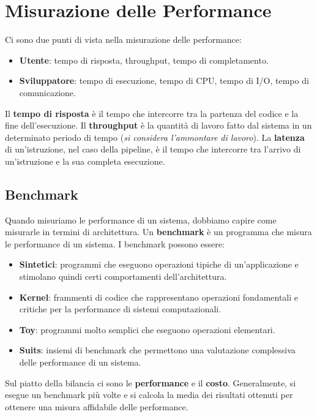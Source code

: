 \chapter{Misurazione delle Performance}

Ci sono due punti di vista nella misurazione delle
performance:
\begin{itemize}
  \item \textbf{Utente}: tempo di risposta, throughput,
  tempo di completamento.
  \item \textbf{Sviluppatore}: tempo di esecuzione, tempo
  di CPU, tempo di I/O, tempo di comunicazione.
\end{itemize}

Il \textbf{tempo di risposta} è il tempo che intercorre
tra la partenza del codice e la fine dell'esecuzione. Il
\textbf{throughput} è la quantità di lavoro fatto dal
sistema in un determinato periodo di tempo (\textit{si considera
l'ammontare di lavoro}). La \textbf{latenza} di
un'istruzione, nel caso della pipeline, è il tempo che
intercorre tra l'arrivo di un'istruzione e la sua completa
esecuzione.

\section{Benchmark}

Quando misuriamo le performance di un sistema, dobbiamo
capire come misurarle in termini di architettura. Un
\textbf{benchmark} è un programma che misura le
performance di un sistema. I benchmark possono essere:
\begin{itemize}
  \item \textbf{Sintetici}: programmi che eseguono
  operazioni tipiche di un'applicazione e stimolano
  quindi certi comportamenti dell'architettura.
  \item \textbf{Kernel}: frammenti di codice che
  rappresentano operazioni fondamentali e critiche per
  la performance di sistemi computazionali.
  \item \textbf{Toy}: programmi molto semplici che
  eseguono operazioni elementari.
  \item \textbf{Suits}: insiemi di benchmark che
  permettono una valutazione complessiva delle performance
  di un sistema.
\end{itemize}

Sul piatto della bilancia ci sono le \textbf{performance}
e il \textbf{costo}. Generalmente, si esegue un benchmark
più volte e si calcola la media dei risultati ottenuti
per ottenere una misura affidabile delle performance.

